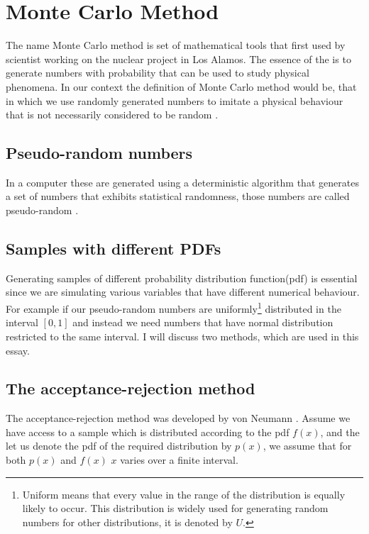      
      
\section{Monte Carlo Method}
The name Monte Carlo method is set of mathematical tools that first used by scientist working on the nuclear project in Los Alamos. The essence of the is to generate numbers with probability that can be used to study physical phenomena. In our context the definition of Monte Carlo method would be, that in which we use randomly generated numbers to imitate a physical behaviour that is not necessarily considered to be random \citep{montecarlo}.

\subsection{Pseudo-random numbers}
In a computer these are generated using a deterministic algorithm that generates a set of numbers that exhibits statistical randomness, those numbers are called pseudo-random \citep{montecarlo}.


\subsection{Samples with different PDFs}

Generating samples of different probability distribution function(pdf) is essential since we are simulating various variables that have different numerical behaviour. For example if our pseudo-random numbers are uniformly\footnote{Uniform means that every value in the range of the distribution is equally likely to occur. This distribution is widely used for generating random numbers for other distributions, it is denoted by $U$.} distributed in the interval $[0,1]$  and instead we need numbers that have normal distribution restricted to the same interval. I will discuss two methods, which are used in this essay.

\subsection{The acceptance-rejection method}

The acceptance-rejection method was developed by von Neumann \citep{Weinzierl}.
Assume we have access to a sample which is distributed according to the pdf $f(x)$,
and the let us denote the pdf of the required distribution by $p(x)$, we assume that for both $p(x)$ and $f(x)$ $x$ varies over a finite interval.
 
